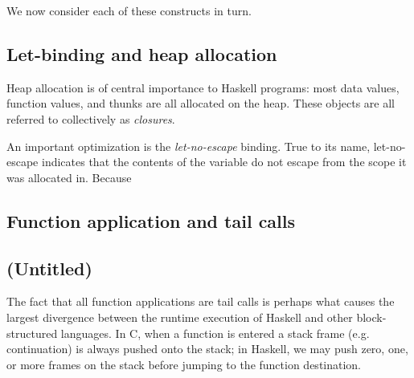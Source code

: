 We now consider each of these constructs in turn.

\subsection{Let-binding and heap allocation}

Heap allocation is of central importance to Haskell programs: most data
values, function values, and thunks are all allocated on the heap.  These objects are
all referred to collectively as \emph{closures}.  

An important optimization is the \emph{let-no-escape} binding.  True
to its name, let-no-escape indicates that the contents of the variable
do not escape from the scope it was allocated in.  Because 

\subsection{Function application and tail calls}



\subsection{(Untitled)}

The fact that all function applications are tail calls is perhaps what
causes the largest divergence between the runtime execution of Haskell
and other block-structured languages.  In C, when a function is entered
a stack frame (e.g. continuation) is always pushed onto the stack; in
Haskell, we may push zero, one, or more frames on the stack before
jumping to the function destination.

